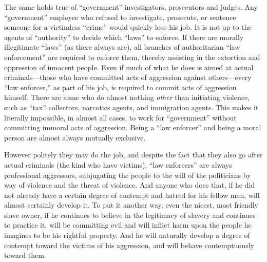 \documentclass{book}
\begin{document}
The same holds true of \enquote{government} investigators, prosecutors and judges. Any \enquote{government} employee who refused to investigate, prosecute, or sentence someone for a victimless \enquote{crime} would quickly lose his job. It is not up to the agents of \enquote{authority} to decide which \enquote{laws} to enforce. If there are morally illegitimate \enquote{laws} (as there always are), all branches of authoritarian \enquote{law enforcement} are required to enforce them, thereby assisting in the extortion and oppression of innocent people. Even if much of what he does is aimed at actual criminals---those who have committed acts of aggression against others---every \enquote{law enforcer,} as part of his job, is required to commit acts of aggression himself. There are some who do almost nothing \emph{other} than initiating violence, such as \enquote{tax} collectors, narcotics agents, and immigration agents. This makes it literally impossible, in almost all cases, to work for \enquote{government} without committing immoral acts of aggression. Being a \enquote{law enforcer} and being a moral person are almost always mutually exclusive.

However politely they may do the job, and despite the fact that they also go after actual criminals (the kind who have victims), \enquote{law enforcers} are always professional aggressors, subjugating the people to the will of the politicians by way of violence and the threat of violence. And anyone who does that, if he did not already have a certain degree of contempt and hatred for his fellow man, will almost certainly develop it. To put it another way, even the nicest, most friendly slave owner, if he continues to believe in the legitimacy of slavery and continues to practice it, will be committing evil and will inflict harm upon the people he imagines to be his rightful property. And he will naturally develop a degree of contempt toward the victims of his aggression, and will behave contemptuously toward them.
\end{document}
